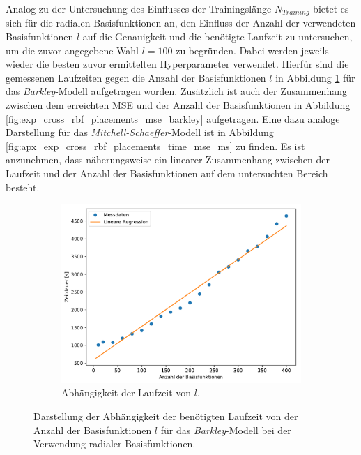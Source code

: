 Analog zu der Untersuchung des Einflusses der Trainingslänge $N_{Training}$ bietet es sich für die radialen Basisfunktionen an, den Einfluss der Anzahl der verwendeten Basisfunktionen $l$ auf die Genauigkeit und die benötigte Laufzeit zu untersuchen, um die zuvor angegebene Wahl $l=100$ zu begründen. Dabei werden jeweils wieder die besten zuvor ermittelten Hyperparameter verwendet. Hierfür sind die gemessenen Laufzeiten gegen die Anzahl der Basisfunktionen $l$ in Abbildung \ref{fig:exp_cross_rbf_placements_time_barkley} für das \textit{Barkley}-Modell aufgetragen worden. Zusätzlich ist auch der Zusammenhang zwischen dem erreichten MSE und der Anzahl der Basisfunktionen in Abbildung \ref{fig:exp_cross_rbf_placements_mse_barkley} aufgetragen. Eine dazu analoge Darstellung für das \textit{Mitchell-Schaeffer}-Modell ist in Abbildung \ref{fig:apx_exp_cross_rbf_placements_time_mse_ms} zu finden. Es ist anzunehmen, dass näherungsweise ein linearer Zusammenhang zwischen der Laufzeit und der Anzahl der Basisfunktionen auf dem untersuchten Bereich besteht.

\begin{figure}[h]
	\centering
	\begin{subfigure}{\textwidth}
		\centering
		\includegraphics[width=4.2in]{figures/results/cross_prediction/rbf_placements_uv_time.pdf}
		\caption{Abhängigkeit der Laufzeit von $l$.}
	\end{subfigure}%
	\caption{Darstellung der Abhängigkeit der benötigten Laufzeit von der Anzahl der Basisfunktionen $l$ für das \textit{Barkley}-Modell bei der Verwendung radialer Basisfunktionen.}
	\label{fig:exp_cross_rbf_placements_time_barkley}
\end{figure}

